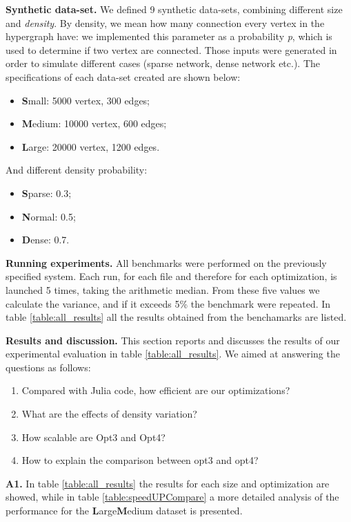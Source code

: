 \documentclass[conference]{IEEEtran}
\newcommand{\mypar}[1]{{\bf #1.}}
\begin{document}
\mypar{Synthetic data-set} We defined 9 synthetic data-sets, combining different size and \textit{density}. By density, we mean how many connection every vertex in the hypergraph have: we implemented this parameter as a probability \textit{p}, which is used to determine if two vertex are connected. Those inputs were generated in order to simulate different cases (sparse network, dense network etc.).
The specifications of each data-set created are shown below:
\begin{itemize}
    \item \textbf{S}mall: 5000 vertex, 300 edges;
    \item \textbf{M}edium: 10000 vertex, 600 edges;
    \item \textbf{L}arge: 20000 vertex, 1200 edges.
\end{itemize}
And different density probability:
\begin{itemize}
    \item \textbf{S}parse: 0.3;
    \item \textbf{N}ormal: 0.5;
    \item \textbf{D}ense: 0.7.
\end{itemize}

\mypar{Running experiments} All benchmarks were performed on the previously specified system. Each run, for each file and therefore for each optimization, is launched 5 times, taking the arithmetic median. From these five values we calculate the variance, and if it exceeds 5\% the benchmark were repeated. In table \ref{table:all_results} all the results obtained from the benchamarks are listed.

\mypar{Results and discussion} This section reports and discusses the results of our experimental evaluation in table \ref{table:all_results}. We aimed at answering the questions as follows:
\begin{enumerate}[start=1,label={\bfseries Q\arabic*:}]
    \item Compared with Julia code, how efficient are our optimizations?
    \item What are the effects of density variation?
    \item How scalable are Opt3 and Opt4?
    \item How to explain the comparison between opt3 and opt4?
\end{enumerate}
\mypar{A1} In table \ref{table:all_results} the results for each size and optimization are showed, while in table \ref{table:speedUPCompare} a more detailed analysis of the performance for the \textbf{L}arge\textbf{M}edium dataset is presented.
\end{document}

